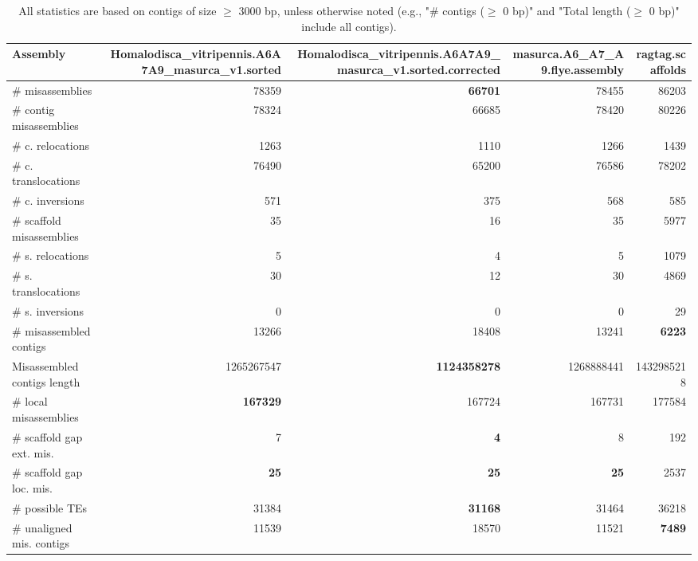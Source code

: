 \documentclass[12pt,a4paper]{article}
\begin{document}
\begin{table}[ht]
\begin{center}
\caption{All statistics are based on contigs of size $\geq$ 3000 bp, unless otherwise noted (e.g., "\# contigs ($\geq$ 0 bp)" and "Total length ($\geq$ 0 bp)" include all contigs).}
\begin{tabular}{|l*{4}{|r}|}
\hline
Assembly & Homalodisca\_vitripennis.A6A7A9\_masurca\_v1.sorted & Homalodisca\_vitripennis.A6A7A9\_masurca\_v1.sorted.corrected & masurca.A6\_A7\_A9.flye.assembly & ragtag.scaffolds \\ \hline
\# misassemblies & 78359 & {\bf 66701} & 78455 & 86203 \\ \hline
\hspace{2mm}\# contig misassemblies & 78324 & 66685 & 78420 & 80226 \\ \hline
\hspace{5mm}\# c. relocations & 1263 & 1110 & 1266 & 1439 \\ \hline
\hspace{5mm}\# c. translocations & 76490 & 65200 & 76586 & 78202 \\ \hline
\hspace{5mm}\# c. inversions & 571 & 375 & 568 & 585 \\ \hline
\hspace{2mm}\# scaffold misassemblies & 35 & 16 & 35 & 5977 \\ \hline
\hspace{5mm}\# s. relocations & 5 & 4 & 5 & 1079 \\ \hline
\hspace{5mm}\# s. translocations & 30 & 12 & 30 & 4869 \\ \hline
\hspace{5mm}\# s. inversions & 0 & 0 & 0 & 29 \\ \hline
\# misassembled contigs & 13266 & 18408 & 13241 & {\bf 6223} \\ \hline
Misassembled contigs length & 1265267547 & {\bf 1124358278} & 1268888441 & 1432985218 \\ \hline
\# local misassemblies & {\bf 167329} & 167724 & 167731 & 177584 \\ \hline
\# scaffold gap ext. mis. & 7 & {\bf 4} & 8 & 192 \\ \hline
\# scaffold gap loc. mis. & {\bf 25} & {\bf 25} & {\bf 25} & 2537 \\ \hline
\# possible TEs & 31384 & {\bf 31168} & 31464 & 36218 \\ \hline
\# unaligned mis. contigs & 11539 & 18570 & 11521 & {\bf 7489} \\ \hline

\end{tabular}
\end{center}
\end{table}
\end{document}

